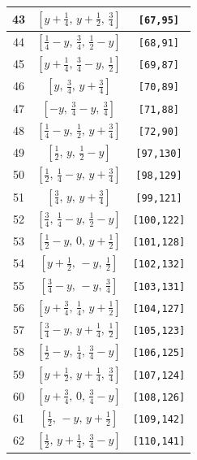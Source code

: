 \documentclass[fleqn,8pt]{jsarticle}
\begin{document}
\begin{longtable}{ccc}
43 & $\left[ y + \frac{1}{4},\, y + \frac{1}{2},\, \frac{3}{4} \right]$ & {\tt [67,95]} \\ \hline
44 & $\left[ \frac{1}{4} - y,\, \frac{3}{4},\, \frac{1}{2} - y \right]$ & {\tt [68,91]} \\ \hline
45 & $\left[ y + \frac{1}{4},\, \frac{3}{4} - y,\, \frac{1}{2} \right]$ & {\tt [69,87]} \\ \hline
46 & $\left[ y,\, \frac{3}{4},\, y + \frac{3}{4} \right]$ & {\tt [70,89]} \\ \hline
47 & $\left[ - y,\, \frac{3}{4} - y,\, \frac{3}{4} \right]$ & {\tt [71,88]} \\ \hline
48 & $\left[ \frac{1}{4} - y,\, \frac{1}{2},\, y + \frac{3}{4} \right]$ & {\tt [72,90]} \\ \hline
49 & $\left[ \frac{1}{2},\, y,\, \frac{1}{2} - y \right]$ & {\tt [97,130]} \\ \hline
50 & $\left[ \frac{1}{2},\, \frac{1}{4} - y,\, y + \frac{3}{4} \right]$ & {\tt [98,129]} \\ \hline
51 & $\left[ \frac{3}{4},\, y,\, y + \frac{3}{4} \right]$ & {\tt [99,121]} \\ \hline
52 & $\left[ \frac{3}{4},\, \frac{1}{4} - y,\, \frac{1}{2} - y \right]$ & {\tt [100,122]} \\ \hline
53 & $\left[ \frac{1}{2} - y,\, 0,\, y + \frac{1}{2} \right]$ & {\tt [101,128]} \\ \hline
54 & $\left[ y + \frac{1}{2},\, - y,\, \frac{1}{2} \right]$ & {\tt [102,132]} \\ \hline
55 & $\left[ \frac{3}{4} - y,\, - y,\, \frac{3}{4} \right]$ & {\tt [103,131]} \\ \hline
56 & $\left[ y + \frac{3}{4},\, \frac{1}{4},\, y + \frac{1}{2} \right]$ & {\tt [104,127]} \\ \hline
57 & $\left[ \frac{3}{4} - y,\, y + \frac{1}{4},\, \frac{1}{2} \right]$ & {\tt [105,123]} \\ \hline
58 & $\left[ \frac{1}{2} - y,\, \frac{1}{4},\, \frac{3}{4} - y \right]$ & {\tt [106,125]} \\ \hline
59 & $\left[ y + \frac{1}{2},\, y + \frac{1}{4},\, \frac{3}{4} \right]$ & {\tt [107,124]} \\ \hline
60 & $\left[ y + \frac{3}{4},\, 0,\, \frac{3}{4} - y \right]$ & {\tt [108,126]} \\ \hline
61 & $\left[ \frac{1}{2},\, - y,\, y + \frac{1}{2} \right]$ & {\tt [109,142]} \\ \hline
62 & $\left[ \frac{1}{2},\, y + \frac{1}{4},\, \frac{3}{4} - y \right]$ & {\tt [110,141]} \\ \hline

\end{longtable}
\end{document}

